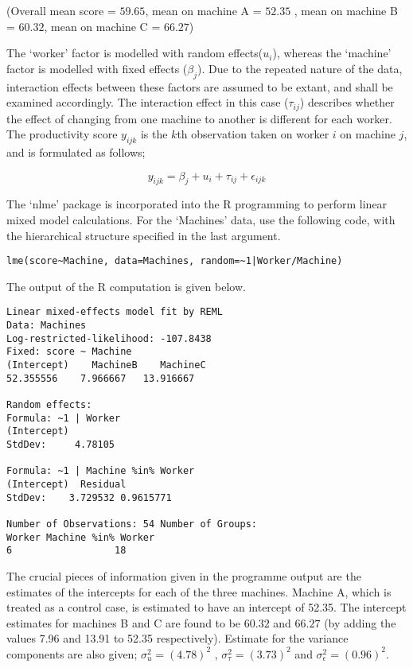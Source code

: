 (Overall mean score = $59.65$, mean on machine A = $52.35$ , mean
on machine B = $60.32$, mean on machine C = $66.27$)


The `worker' factor is modelled with random effects($u_{i}$),
whereas the `machine' factor is modelled with fixed effects
($\beta_{j}$). Due to the repeated nature of the data, interaction
effects between these factors are assumed to be extant, and shall
be examined accordingly. The interaction effect in this case
($\tau_{ij}$) describes whether the effect of changing from one
machine to another is different for each worker. The productivity
score $y_{ijk}$ is the $k$th observation taken on worker $i$ on
machine $j$, and is formulated
as follows;

\begin{equation}
y_{ijk} = \beta_{j} + u_{i} + \tau_{ij} + \epsilon_{ijk}
\end{equation}

The `nlme' package is incorporated into the R programming to
perform linear mixed model calculations. For the `Machines' data,
\citet{pb} use the following code, with the hierarchical structure
specified in the last argument.
\begin{verbatim}
lme(score~Machine, data=Machines, random=~1|Worker/Machine)
\end{verbatim}


The output of the R computation is given below.
\begin{verbatim}
Linear mixed-effects model fit by REML
Data: Machines
Log-restricted-likelihood: -107.8438
Fixed: score ~ Machine
(Intercept)    MachineB    MachineC
52.355556    7.966667   13.916667

Random effects:
Formula: ~1 | Worker
(Intercept)
StdDev:     4.78105

Formula: ~1 | Machine %in% Worker
(Intercept)  Residual
StdDev:    3.729532 0.9615771

Number of Observations: 54 Number of Groups:
Worker Machine %in% Worker
6                  18

\end{verbatim}


The crucial pieces of information given in the programme output
are the estimates of the intercepts for each of the three
machines. Machine A, which is treated as a control case, is
estimated to have an intercept of 52.35. The intercept estimates
for machines B and C are found to be $60.32$ and $66.27$ (by
adding the values 7.96 and 13.91 to 52.35 respectively). Estimate
for the variance components are also given; $\sigma^{2}_{u} =
(4.78)^{2}$ , $\sigma^{2}_{\tau} = (3.73)^{2}$ and
$\sigma^{2}_{\epsilon} = (0.96)^{2}$.
